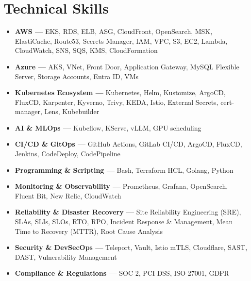 \documentclass[11pt,a4paper,sans]{moderncv}
\begin{document}
\section{Technical Skills}
{\begin{itemize}[label=\textbullet, topsep=4pt, itemsep=2pt, parsep=0pt]
\item {\textbf{AWS —} EKS, RDS, ELB, ASG, CloudFront, OpenSearch, MSK, ElastiCache, Route53, Secrets Manager, IAM, VPC, S3, EC2, Lambda, CloudWatch, SNS, SQS, KMS, CloudFormation}
\item {\textbf{Azure —} AKS, VNet, Front Door, Application Gateway, MySQL Flexible Server, Storage Accounts, Entra ID, VMs}
\item {\textbf{Kubernetes Ecosystem —} Kubernetes, Helm, Kustomize, ArgoCD, FluxCD, Karpenter, Kyverno, Trivy, KEDA, Istio, External Secrets, cert-manager, Lens, Kubebuilder}
\item {\textbf{AI \& MLOps —} Kubeflow, KServe, vLLM, GPU scheduling}
\item {\textbf{CI/CD \& GitOps —} GitHub Actions, GitLab CI/CD, ArgoCD, FluxCD, Jenkins, CodeDeploy, CodePipeline}
\item {\textbf{Programming \& Scripting —} Bash, Terraform HCL, Golang, Python}
\item {\textbf{Monitoring \& Observability —} Prometheus, Grafana, OpenSearch, Fluent Bit, New Relic, CloudWatch}
\item {\textbf{Reliability \& Disaster Recovery —} Site Reliability Engineering (SRE), SLAs, SLIs, SLOs, RTO, RPO, Incident Response \& Management, Mean Time to Recovery (MTTR), Root Cause Analysis}
\item {\textbf{Security \& DevSecOps —} Teleport, Vault, Istio mTLS, Cloudflare, SAST, DAST, Vulnerability Management}
\item {\textbf{Compliance \& Regulations —} SOC 2, PCI DSS, ISO 27001, GDPR}
\end{itemize}}
\end{document}
